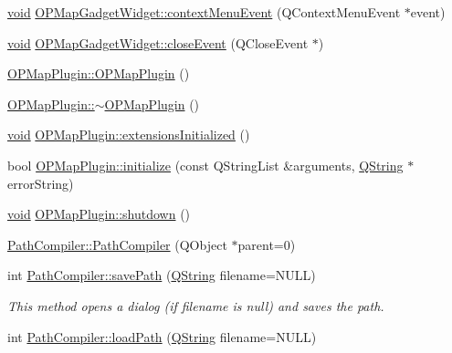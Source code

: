 \begin{DoxyCompactItemize}
\hyperlink{group___u_a_v_objects_plugin_ga444cf2ff3f0ecbe028adce838d373f5c}{void} \hyperlink{group___o_p_map_plugin_gab4575b0db17580cc1a575aafa2fc5710}{\-O\-P\-Map\-Gadget\-Widget\-::context\-Menu\-Event} (\-Q\-Context\-Menu\-Event $\ast$event)
\item 
\hyperlink{group___u_a_v_objects_plugin_ga444cf2ff3f0ecbe028adce838d373f5c}{void} \hyperlink{group___o_p_map_plugin_ga07f947001ed1fdf9d099f170e5116aa2}{\-O\-P\-Map\-Gadget\-Widget\-::close\-Event} (\-Q\-Close\-Event $\ast$)
\item 
\hyperlink{group___o_p_map_plugin_ga1c402cf38d48ab5c7dacf62490bb5bc2}{\-O\-P\-Map\-Plugin\-::\-O\-P\-Map\-Plugin} ()
\item 
\hyperlink{group___o_p_map_plugin_gaa1ca844e6b44f8013f6ad72889055c41}{\-O\-P\-Map\-Plugin\-::$\sim$\-O\-P\-Map\-Plugin} ()
\item 
\hyperlink{group___u_a_v_objects_plugin_ga444cf2ff3f0ecbe028adce838d373f5c}{void} \hyperlink{group___o_p_map_plugin_ga4698621f6178bff1aad1d856fbcc3e08}{\-O\-P\-Map\-Plugin\-::extensions\-Initialized} ()
\item 
bool \hyperlink{group___o_p_map_plugin_gac6a236b2b4276677428bd2305710a2d7}{\-O\-P\-Map\-Plugin\-::initialize} (const \-Q\-String\-List \&arguments, \hyperlink{group___u_a_v_objects_plugin_gab9d252f49c333c94a72f97ce3105a32d}{\-Q\-String} $\ast$error\-String)
\item 
\hyperlink{group___u_a_v_objects_plugin_ga444cf2ff3f0ecbe028adce838d373f5c}{void} \hyperlink{group___o_p_map_plugin_ga76c3d81f95369b3c96c26739bc07e506}{\-O\-P\-Map\-Plugin\-::shutdown} ()
\item 
\hyperlink{group___o_p_map_plugin_ga9270b91f203f6c656318dbfb7b6f0d2d}{\-Path\-Compiler\-::\-Path\-Compiler} (\-Q\-Object $\ast$parent=0)
\item 
int \hyperlink{group___o_p_map_plugin_gadd7f57ff007094b9434d1864b52c13ad}{\-Path\-Compiler\-::save\-Path} (\hyperlink{group___u_a_v_objects_plugin_gab9d252f49c333c94a72f97ce3105a32d}{\-Q\-String} filename=\-N\-U\-L\-L)
\begin{DoxyCompactList}\small\item\em \-This method opens a dialog (if filename is null) and saves the path. \end{DoxyCompactList}\item 
int \hyperlink{group___o_p_map_plugin_ga6fb97167102fdadaeadd9d6686c3aea0}{\-Path\-Compiler\-::load\-Path} (\hyperlink{group___u_a_v_objects_plugin_gab9d252f49c333c94a72f97ce3105a32d}{\-Q\-String} filename=\-N\-U\-L\-L)

\end{DoxyCompactItemize}
